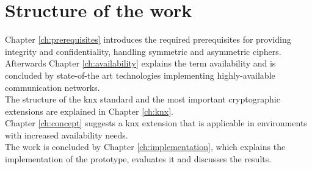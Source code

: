 \section{Structure of the work}

Chapter \ref{ch:prerequisites} introduces the required prerequisites for providing integrity and confidentiality, handling symmetric and asymmetric ciphers. 
Afterwards Chapter \ref{ch:availability} explains the term availability and is concluded by state-of-the art technologies implementing highly-available communication networks.
\\
The structure of the \gls{knx} standard and the most important cryptographic extensions are explained in Chapter \ref{ch:knx}.   
\\
Chapter \ref{ch:concept} suggests a \gls{knx} extension that is applicable in environments with increased availability needs.
\\
The work is concluded by Chapter \ref{ch:implementation}, which explains the implementation of the prototype, evaluates it and discusses the results.



